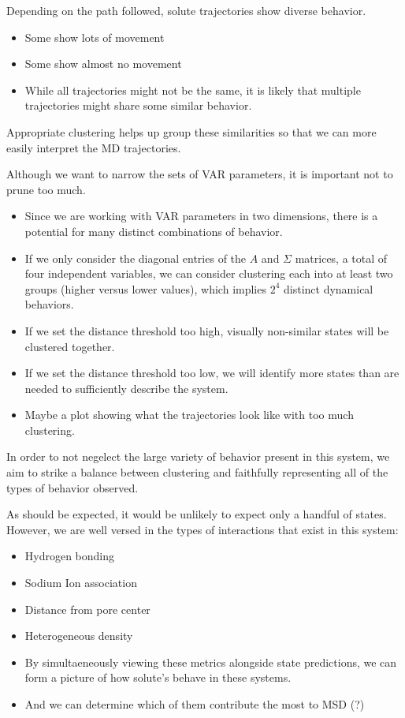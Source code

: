 \documentclass{article}
\begin{document}
  Depending on the path followed, solute trajectories show diverse behavior.
  \begin{itemize}
    \item Some show lots of movement
    \item Some show almost no movement
    \item While all trajectories might not be the same, it is likely that 
    multiple trajectories might share some similar behavior.
  \end{itemize}
  
  Appropriate clustering helps up group these similarities so that we can 
  more easily interpret the MD trajectories.
  
  Although we want to narrow the sets of VAR parameters, it is
  important not to prune too much.
  \begin{itemize}
    \item Since we are working with VAR parameters in two dimensions, there
    is a potential for many distinct combinations of behavior.
    \item If we only consider the diagonal entries of the $A$ and $\Sigma$ matrices,
    a total of four independent variables, we can consider clustering each 
    into at least two groups (higher versus lower values), which implies $2^4$ distinct
    dynamical behaviors. 
    \item If we set the distance threshold too high, visually non-similar states 
    will be clustered together.
    \item If we set the distance threshold too low, we will identify more states 
    than are needed to sufficiently describe the system.
    \item Maybe a plot showing what the trajectories look like with too much clustering. 
  \end{itemize}
  
  In order to not negelect the large variety of behavior present in this system, we
  aim to strike a balance between clustering and faithfully representing all of
  the types of behavior observed. 
  
  
  As should be expected, it would be unlikely to expect only a handful of states.
  However, we are well versed in the types of interactions that exist in this system:
  \begin{itemize}
    \item Hydrogen bonding
    \item Sodium Ion association
    \item Distance from pore center
    \item Heterogeneous density
    \item By simultaeneously viewing these metrics alongside state predictions, we 
    can form a picture of how solute's behave in these systems.
    \item And we can determine which of them contribute the most to MSD (?)
  \end{itemize}
  
\end{document}
